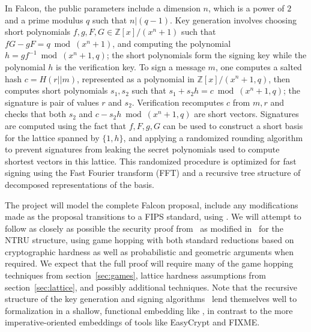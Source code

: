 In Falcon, the public parameters include a dimension $n$, which is a power of $2$ and a prime modulus $q$ such that $n | (q-1)$.  Key generation involves choosing short polynomials $f,g,F,G \in \mathbb{Z}[x]/(x^n+1)$ such that $fG-gF = q \bmod (x^n+1)$, and computing the polynomial $h=gf^{-1} \bmod (x^n+1,q)$; the short polynomials form the signing key while the polynomial $h$ is the verification key.
To sign a message $m$, one computes a salted hash $c = H(r||m)$, represented as a polynomial in $\mathbb{Z}[x]/(x^n+1,q)$, then computes short polynomials $s_1,s_2$ such that $s_1 + s_2h = c \bmod (x^n+1,q)$; the signature is pair of values $r$ and $s_2$.
Verification recomputes $c$ from $m,r$ and checks that both $s_2$ and $c-s_2h \bmod (x^n+1,q)$ are short vectors.
Signatures are computed using the fact that $f,F,g,G$ can be used to construct a short basis for the lattice spanned by $\{1,h\}$, and applying a randomized rounding algorithm to prevent signatures from leaking the secret polynomials used to compute shortest vectors in this lattice.
This randomized procedure is optimized for fast signing using the Fast Fourier transform (FFT) and a recursive tree structure of decomposed representations of the basis.

The project will model the complete Falcon proposal, include any modifications made as the proposal transitions to a FIPS standard, using \vcvio.  We will attempt to follow as closely as possible the security proof from~\cite{GPV} as modified in~\cite{fouque2018falcon} for the NTRU structure, using game hopping with both standard reductions based on cryptographic hardness as well as probabilistic and geometric arguments when required. 
We expect that the full proof will require many of the game hopping techniques from section~\ref{sec:games}, lattice hardness assumptions from section~\ref{sec:lattice}, and possibly additional techniques.  
Note that the recursive structure of the key generation and signing algorithms~\cite{fouque2018falcon} lend themselves well to formalization in a shallow, functional embedding like \vcvio, in contrast to the more imperative-oriented embeddings of tools like EasyCrypt and FIXME.



